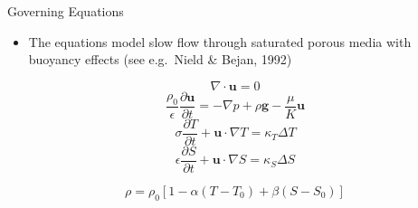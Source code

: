 \documentclass[compress,12pt]{beamer}
\newcommand{\bv}[1]{{\boldsymbol{#1}}}
\newcommand{\D} [2]{\frac{\partial #1}{\partial #2}}
\begin{document}
\begin{frame}{Governing Equations}
  \begin{itemize}
    \item The equations model slow flow through saturated porous media with
      buoyancy effects (see e.g.\ Nield \& Bejan, 1992)
  \end{itemize}
  \begin{equation}
    \nonumber
    \label{eqn:div-free}
    \nabla \cdot \bv{u} = 0 
  \end{equation}
  \begin{equation}
    \nonumber
    \label{eqn:mom}
    \frac{\rho_0}{\epsilon} \D{\bv{u}}{t} = - \nabla p + \rho \bv{g} - \frac{\mu}{K} \bv{u} 
  \end{equation}
  \begin{equation}
    \nonumber
    \label{eqn:T}
    \sigma \D{T}{t} +  \bv{u} \cdot \nabla T = \kappa_T \Delta T 
  \end{equation}
  \begin{equation}
    \nonumber
    \label{eqn:S}
    \epsilon \D{S}{t} + \bv{u} \cdot \nabla S = \kappa_S \Delta S
  \end{equation}

    
  \begin{equation}
    \nonumber
    \rho = \rho_0 [ 1 - \alpha ( T - T_{0} ) + \beta ( S - S_{0} ) ]
  \end{equation}


\end{frame}
\end{document}
